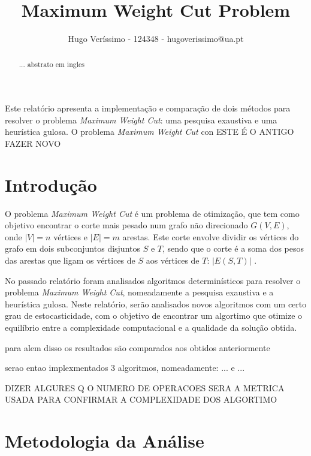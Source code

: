 \documentclass[mirror, portugues]{revdetua}
\begin{document}

\title{Maximum Weight Cut Problem}
\author{Hugo Veríssimo - 124348 - hugoverissimo@ua.pt}
\maketitle

\begin{abstract}
... abstrato em ingles
\end{abstract}

\begin{resumo}
Este relatório apresenta a implementação e comparação de dois métodos para resolver o problema \textit{Maximum Weight Cut}: uma pesquisa exaustiva e uma heurística gulosa. O problema \textit{Maximum Weight Cut} con ESTE É O ANTIGO FAZER NOVO
\end{resumo}

\section{Introdução}

O problema \textit{Maximum Weight Cut} é um problema de otimização, que tem como objetivo encontrar o corte mais pesado num grafo não direcionado $G(V,E)$, onde $|V| = n$ vértices e $|E| = m$ arestas. Este corte envolve dividir os vértices do grafo em dois subconjuntos disjuntos $S$ e $T$, sendo que o corte é a soma dos pesos das arestas que ligam os vértices de $S$ aos vértices de $T$: $|E(S, T)|$ \cite{AG14}.

No passado relatório foram analisados algoritmos determinísticos para resolver o problema \textit{Maximum Weight Cut}, nomeadamente a pesquisa exaustiva e a heurística gulosa. Neste relatório, serão analisados novos algoritmos com um certo grau de estocasticidade, com o objetivo de encontrar um algortimo que otimize o equilíbrio entre a complexidade computacional e a qualidade da solução obtida.

para alem disso os resultados são comparados aos obtidos anteriormente

serao entao implexmentados 3 algoritmos, nomeadamente: ... e ...

DIZER ALGURES Q O NUMERO DE OPERACOES SERA A METRICA USADA PARA CONFIRMAR A COMPLEXIDADE DOS ALGORTIMO

\section{Metodologia da Análise}
\end{document}
